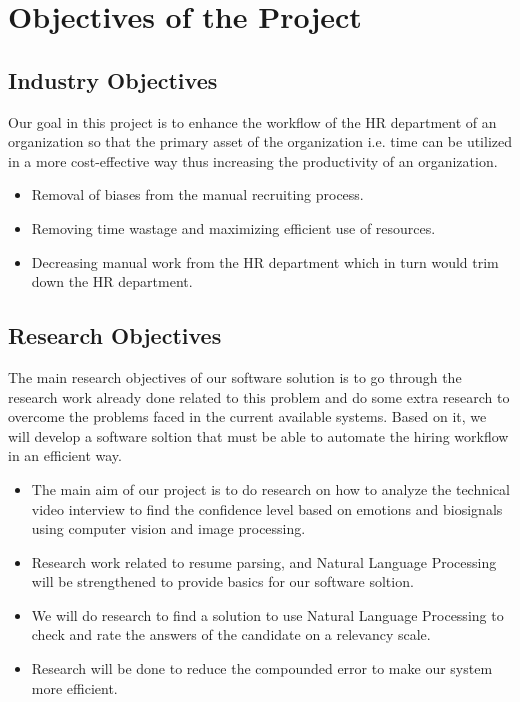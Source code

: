 \section{Objectives of the Project}

\subsection{Industry Objectives}
Our goal in this project is to enhance the workflow of the HR department of an organization so that the primary asset of the organization i.e. time can be utilized in a more cost-effective way thus increasing the productivity of an organization.
\begin{itemize}
\item Removal of biases from the manual recruiting process.
\item Removing time wastage and maximizing efficient use of resources.
\item Decreasing manual work from the HR department which in turn would trim down the HR department.
\end{itemize}

\subsection{Research Objectives}
The main research objectives of our software solution is to go through the research work already done related to this problem and do some extra research to overcome the problems faced in the current available systems. Based on it, we will develop a software soltion that must be able to automate the hiring workflow in an efficient way.
\begin{itemize}
    \item The main aim of our project is to do research on how to analyze the technical video interview to find the confidence level based on emotions and biosignals using computer vision and image processing.
    \item Research work related to resume parsing, and Natural Language Processing will be strengthened to provide basics for our software soltion.
    \item We will do research to find a solution to use Natural Language Processing to check and rate the answers\cite{rokade2018automated} of the candidate on a relevancy scale.
    \item Research will be done to reduce the compounded error to make our system more efficient.
\end{itemize}

